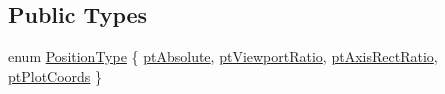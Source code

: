 \subsection*{Public Types}
\begin{DoxyCompactItemize}
\item 
enum \hyperlink{classQCPItemPosition_aad9936c22bf43e3d358552f6e86dbdc8}{Position\+Type} \{ \hyperlink{classQCPItemPosition_aad9936c22bf43e3d358552f6e86dbdc8a564f5e53e550ead1ec5fc7fc7d0b73e0}{pt\+Absolute}, 
\hyperlink{classQCPItemPosition_aad9936c22bf43e3d358552f6e86dbdc8ac7d6aa89ceacb39658b0d6da061c789a}{pt\+Viewport\+Ratio}, 
\hyperlink{classQCPItemPosition_aad9936c22bf43e3d358552f6e86dbdc8a01080fd00eaf09fa238ef6b73bbfef75}{pt\+Axis\+Rect\+Ratio}, 
\hyperlink{classQCPItemPosition_aad9936c22bf43e3d358552f6e86dbdc8ad5ffb8dc99ad73263f7010c77342294c}{pt\+Plot\+Coords}
 \}
\end{DoxyCompactItemize}

